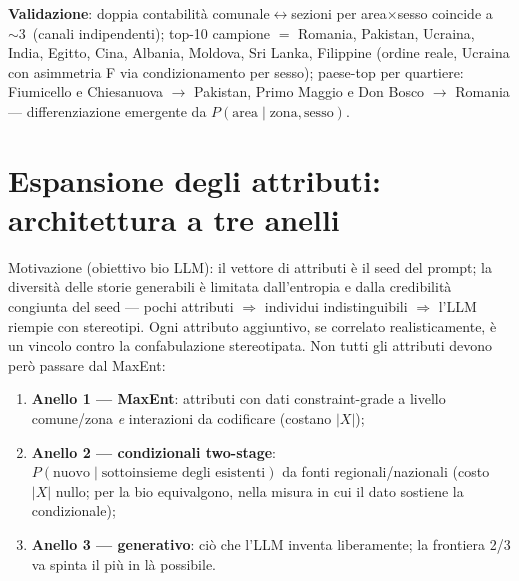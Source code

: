 \documentclass[11pt,a4paper]{article}
\begin{document}
\medskip\noindent\textbf{Validazione}: doppia contabilit\`a
comunale$\leftrightarrow$sezioni per area$\times$sesso coincide a
$\sim3$\textperthousand\ (canali indipendenti); top-10 campione $=$
Romania, Pakistan, Ucraina, India, Egitto, Cina, Albania, Moldova, Sri
Lanka, Filippine (ordine reale, Ucraina con asimmetria F via
condizionamento per sesso); paese-top per quartiere: Fiumicello e
Chiesanuova $\to$ Pakistan, Primo Maggio e Don Bosco $\to$ Romania ---
differenziazione emergente da $P(\text{area}\mid\text{zona},\text{sesso})$.

\section{Espansione degli attributi: architettura a tre anelli}
\label{sec:anelli}
Motivazione (obiettivo bio LLM): il vettore di attributi \`e il seed del
prompt; la diversit\`a delle storie generabili \`e limitata dall'entropia e
dalla credibilit\`a congiunta del seed --- pochi attributi $\Rightarrow$
individui indistinguibili $\Rightarrow$ l'LLM riempie con stereotipi.
Ogni attributo aggiuntivo, se correlato realisticamente, \`e un vincolo
contro la confabulazione stereotipata. Non tutti gli attributi devono per\`o
passare dal MaxEnt:
\begin{enumerate}[leftmargin=*,itemsep=1pt]
  \item \textbf{Anello 1 --- MaxEnt}: attributi con dati constraint-grade a
  livello comune/zona \emph{e} interazioni da codificare (costano $|X|$);
  \item \textbf{Anello 2 --- condizionali two-stage}: $P(\text{nuovo}\mid
  \text{sottoinsieme degli esistenti})$ da fonti regionali/nazionali
  (costo $|X|$ nullo; per la bio equivalgono, nella misura in cui il dato
  sostiene la condizionale);
  \item \textbf{Anello 3 --- generativo}: ci\`o che l'LLM inventa
  liberamente; la frontiera 2/3 va spinta il pi\`u in l\`a possibile.
\end{enumerate}
\end{document}
